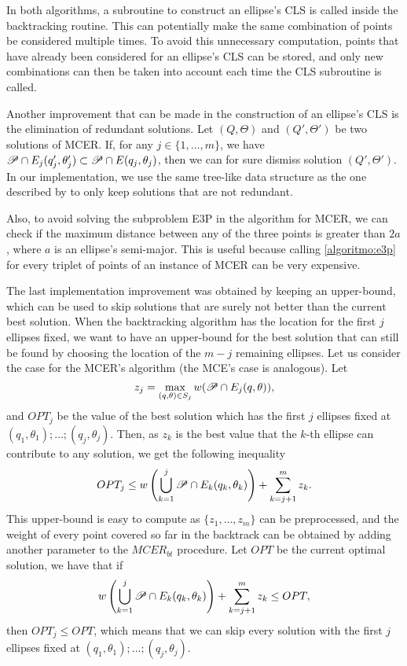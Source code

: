 In both algorithms, a subroutine to construct an ellipse's CLS is called inside the backtracking routine. This can potentially make the same combination of points be considered multiple times.
To avoid this unnecessary computation, points that have already been considered for an ellipse's CLS can be stored, and only new combinations can then be taken into account each time the CLS subroutine is called. 

Another improvement that can be made in the construction of an ellipse's CLS is the elimination of redundant solutions.
Let $(Q, \Theta)$ and $(Q', \Theta')$ be two solutions of MCER. If, for any $j \in \{1, \dots, m\}$, we have $\mathscr{P} \cap E_j(q_j', \theta_j') \subset \mathscr{P} \cap E(q_j, \theta_j)$, then we can for sure dismiss solution $(Q', \Theta')$.
In our implementation, we use the same tree-like data structure as the one described by  to only keep solutions that are not redundant.

Also, to avoid solving the subproblem E3P in the algorithm for MCER, we can check if the maximum distance between any of the three points is greater than $2a$, where $a$ is an ellipse's semi-major. This is useful because calling \autoref{algoritmo:e3p} for every triplet of points of an instance of MCER can be very expensive.

The last implementation improvement was obtained by keeping an upper-bound, which can be used to skip solutions that are surely not better than the current best solution.
When the backtracking algorithm has the location for the first $j$ ellipses fixed, we want to have an upper-bound for the best solution that can still be found by choosing the location of the $m-j$ remaining ellipses.
Let us consider the case for the MCER's algorithm (the MCE's case is analogous). Let $$z_j = \max_{(q, \theta) \in S_j} w(\mathscr{P} \cap E_j(q, \theta)),$$ and $OPT_j$ be the value of the best solution which has the first $j$ ellipses fixed at $(q_1, \theta_1); \dots; (q_j, \theta_j)$. Then, as $z_k$ is the best value that the $k$-th ellipse can contribute to any solution, we get the following inequality
\begin{equation*}
OPT_j \le w\left(\bigcup_{k=1}^{j} \mathscr{P} \cap E_k(q_k, \theta_k)\right) + \sum_{k=j+1}^m z_k.
\end{equation*}
This upper-bound is easy to compute as $\{z_1, \dots, z_m\}$ can be preprocessed, and the weight of every point covered so far in the backtrack can be obtained by adding another parameter to the $MCER_{bt}$ procedure.
Let $OPT$ be the current optimal solution, we have that if
\begin{equation}
\label{eq:upper-bound}
w\left(\bigcup_{k=1}^{j} \mathscr{P} \cap E_k(q_k, \theta_k)\right) + \sum_{k=j+1}^m z_k \le OPT,
\end{equation}
then $OPT_j \le OPT$, which means that we can skip every solution with the first $j$ ellipses fixed at $(q_1, \theta_1); \dots; (q_j, \theta_j)$.

